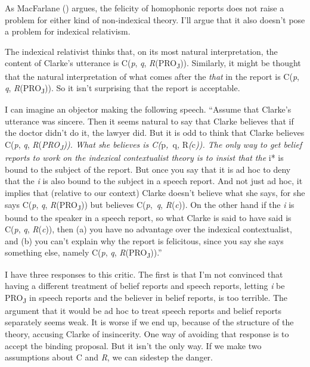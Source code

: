 \documentclass[
  11pt,
  letterpaper,
  DIV=11,
  numbers=noendperiod,
  twoside]{scrartcl}
\begin{document}
As MacFarlane () argues, the
felicity of homophonic reports does not raise a problem for either kind
of non-indexical theory. I'll argue that it also doesn't pose a problem
for indexical relativism.

The indexical relativist thinks that, on its most natural
interpretation, the content of Clarke's utterance is C(\emph{p},
\emph{q}, \emph{R}(PRO\textsubscript{J})). Similarly, it might be
thought that the natural interpretation of what comes after the
\emph{that} in the report is C(\emph{p}, \emph{q},
\emph{R}(PRO\textsubscript{J})). So it isn't surprising that the report
is acceptable.

I can imagine an objector making the following speech. ``Assume that
Clarke's utterance was sincere. Then it seems natural to say that Clarke
believes that if the doctor didn't do it, the lawyer did. But it is odd
to think that Clarke believes C(\emph{p}, \emph{q},
\emph{R}(\emph{PRO\textsubscript{J})). What she believes is
C(}p\emph{,~}q\emph{, }R\emph{(}c\emph{)). The only way to get belief
reports to work on the indexical contextualist theory is to insist that
the }i* is bound to the subject of the report. But once you say that it
is ad hoc to deny that the \emph{i} is also bound to the subject in a
speech report. And not just ad hoc, it implies that (relative to our
context) Clarke doesn't believe what she says, for she says C(\emph{p},
\emph{q}, \emph{R}(PRO\textsubscript{J})) but believes
C(\emph{p},~\emph{q}, \emph{R}(\emph{c})). On the other hand if the
\emph{i} is bound to the speaker in a speech report, so what Clarke is
said to have said is C(\emph{p}, \emph{q}, \emph{R}(\emph{c})), then (a)
you have no advantage over the indexical contextualist, and (b) you
can't explain why the report is felicitous, since you say she says
something else, namely C(\emph{p}, \emph{q},
\emph{R}(PRO\textsubscript{J})).''

I have three responses to this critic. The first is that I'm not
convinced that having a different treatment of belief reports and speech
reports, letting \emph{i} be PRO\textsubscript{J} in speech reports and
the believer in belief reports, is too terrible. The argument that it
would be ad hoc to treat speech reports and belief reports separately
seems weak. It is worse if we end up, because of the structure of the
theory, accusing Clarke of insincerity. One way of avoiding that
response is to accept the binding proposal. But it isn't the only way.
If we make two assumptions about C and \emph{R}, we can sidestep the
danger.
\end{document}
